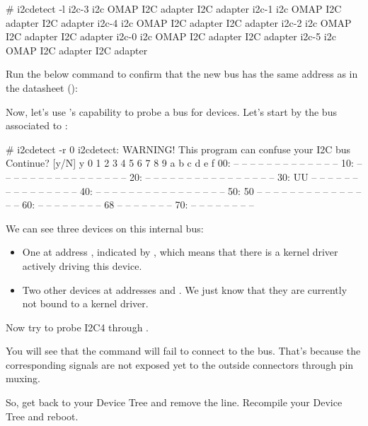\begin{bashinput}
# i2cdetect -l
i2c-3	i2c       	OMAP I2C adapter                	I2C adapter
i2c-1	i2c       	OMAP I2C adapter                	I2C adapter
i2c-4	i2c       	OMAP I2C adapter                	I2C adapter
i2c-2	i2c       	OMAP I2C adapter                	I2C adapter
i2c-0	i2c       	OMAP I2C adapter                	I2C adapter
i2c-5	i2c       	OMAP I2C adapter                	I2C adapter
\end{bashinput}

Run the below command to confirm that the new bus has the same address
as in the datasheet ():


Now, let's use 's capability to probe a bus for devices.
Let's start by the bus associated to :

\begin{bashinput}
# i2cdetect -r 0
i2cdetect: WARNING! This program can confuse your I2C bus
Continue? [y/N] y
     0  1  2  3  4  5  6  7  8  9  a  b  c  d  e  f
00:          -- -- -- -- -- -- -- -- -- -- -- -- --
10: -- -- -- -- -- -- -- -- -- -- -- -- -- -- -- --
20: -- -- -- -- -- -- -- -- -- -- -- -- -- -- -- --
30: UU -- -- -- -- -- -- -- -- -- -- -- -- -- -- --
40: -- -- -- -- -- -- -- -- -- -- -- -- -- -- -- --
50: 50 -- -- -- -- -- -- -- -- -- -- -- -- -- -- --
60: -- -- -- -- -- -- -- -- 68 -- -- -- -- -- -- --
70: -- -- -- -- -- -- -- --
\end{bashinput}

We can see three devices on this internal bus:
\begin{itemize}
\item One at address , indicated by ,
      which means that there is a kernel driver actively
      driving this device.
\item Two other devices at addresses  and .
      We just know that they are currently not bound to a kernel driver.
\end{itemize}

Now try to probe I2C4  through .

You will see that the command will fail to connect to
the bus. That's because the corresponding signals are
not exposed yet to the outside connectors through pin muxing.

So, get back to your Device Tree and remove the  line. Recompile your
Device Tree and reboot.

